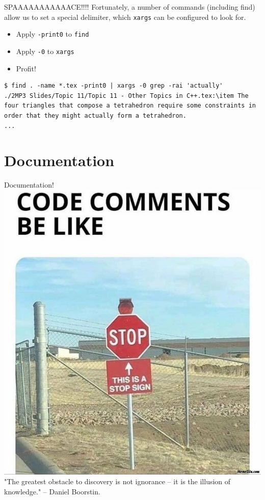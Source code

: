 \documentclass[11pt]{beamer}
\begin{document}
\begin{frame}[fragile=singleslide]{SPAAAAAAAAAAACE!!!!}
Fortunately, a number of commands (including find) allow us to set a special delimiter, which \texttt{xargs} can be configured to look for.
\begin{itemize}
\item Apply \texttt{-print0} to \texttt{find}
\item Apply \texttt{-0} to \texttt{xargs}
\item Profit!
\end{itemize}
\begin{lstlisting}[style=terminal]
$ find . -name *.tex -print0 | xargs -0 grep -rai 'actually'
./2MP3 Slides/Topic 11/Topic 11 - Other Topics in C++.tex:\item The four triangles that compose a tetrahedron require some constraints in order that they might actually form a tetrahedron.
...
\end{lstlisting}
\end{frame}

\section[Documentation]{Documentation}
\begin{frame}{Documentation!}
\center
\includegraphics[scale=0.15]{comments.png} \\
"The greatest obstacle to discovery is not ignorance -- it is the illusion of knowledge." -- Daniel Boorstin.
\end{frame}
\end{document}
